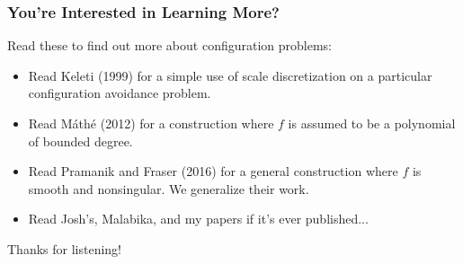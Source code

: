 \documentclass[usenames,dvipsnames]{beamer}
\begin{document}
\begin{frame}
    \frametitle{You're Interested in Learning More?}

Read these to find out more about configuration problems:

    \begin{itemize}
            \item Read Keleti (1999) for a simple use of scale discretization on a particular configuration avoidance problem.
            \item Read M\'{a}th\'{e} (2012) for a construction where $f$ is assumed to be a polynomial of bounded degree.
            \item Read Pramanik and Fraser (2016) for a general construction where $f$ is smooth and nonsingular. We generalize their work.
            \item Read Josh's, Malabika, and my papers if it's ever published...
    \end{itemize}

    Thanks for listening!
\end{frame}
\end{document}
